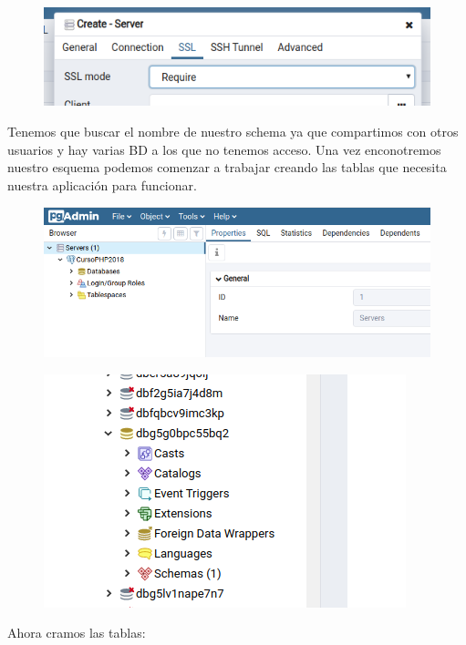 \documentclass{article}
\begin{document}
\begin{figure}[h!]
  \centering
  \includegraphics[scale=0.5]{./Pictures/273_ssl.png}
\end{figure}

Tenemos que buscar el nombre de nuestro schema ya que compartimos con otros
usuarios y hay varias BD a los que no tenemos acceso. Una vez enconotremos
nuestro esquema podemos comenzar a trabajar creando las tablas que necesita
nuestra aplicación para funcionar.\\

\begin{figure}[h!]
  \centering
  \includegraphics[scale=0.5]{./Pictures/274_server.png}
\end{figure}

\begin{figure}[h!]
  \centering
  \includegraphics[scale=0.5]{./Pictures/275_schemas.png}
\end{figure}

Ahora cramos las tablas:
\end{document}
